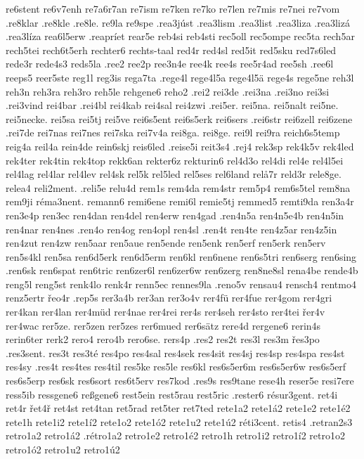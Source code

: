 {{re6stent
re6v7enh
re7a6r7an
re7ism
re7ken
re7ko
re7len
re7mis
re7nei
re7vom
.re8klar
.re8kle
.re8le.
re9la
re9spe
.rea3júst
.rea3lism
.rea3list
.rea3liza
.rea3lizá
.rea3líza
rea6l5erw
.reapríet
rear5e
reb4si
reb4sti
rec5oll
rec5ompe
rec5ta
rech5ar
rech5tei
rech6t5erh
rechter6
rechts-taal
red4r
red4sl
red5it
red5sku
red7s6led
rede3r
rede4s3
reds5la
.ree2
ree2p
ree3n4e
ree4k
ree4s
ree5r4ad
ree5sh
.ree6l
reeps5
reer5ste
reg1l
reg3is
rega7ta
.rege4l
rege4l5a
rege4l5ä
rege4s
rege5ne
reh3l
reh3n
reh3ra
reh3ro
reh5le
rehgene6
reho2
.rei2
rei3de
.rei3na
.rei3no
rei3si
.rei3vind
rei4bar
.rei4bl
rei4kab
rei4sal
rei4zwi
.rei5er.
rei5na.
rei5nalt
rei5ne.
rei5necke.
rei5sa
rei5tj
rei5ve
rei6s5ent
rei6s5erk
rei6sers
.rei6str
rei6zell
rei6zene
.rei7de
rei7nas
rei7nes
rei7ska
rei7v4a
rei8ga.
rei8ge.
rei9l
rei9ra
reich6s5temp
reig4a
reil4a
rein4de
rein6skj
reis6led
.reise5i
reit3s4
.rej4
rek3sp
rek4k5v
rek4led
rek4ter
rek4tin
rek4top
rekk6an
rekter6z
rekturin6
rel4d3o
rel4di
rel4e
rel4l5ei
rel4lag
rel4lar
rel4lev
rel4sk
rel5k
rel5led
rel5ses
rel6land
relå7r
reld3r
rele8ge.
relea4
reli2ment.
.reli5e
relu4d
rem1s
rem4da
rem4str
rem5p4
rem6s5tel
rem8na
rem9ji
réma3nent.
remann6
remi6ene
remi6l
remie5tj
remmed5
remti9da
ren3a4r
ren3e4p
ren3ec
ren4dan
ren4del
ren4erw
ren4gad
.ren4n5a
ren4n5e4b
ren4n5in
ren4nar
ren4nes
.ren4o
ren4og
ren4opl
ren4sl
.ren4t
ren4te
ren4z5ar
ren4z5in
ren4zut
ren4zw
ren5aar
ren5aue
ren5ende
ren5enk
ren5erf
ren5erk
ren5erv
ren5s4kl
ren5sa
ren6d5erk
ren6d5erm
ren6kl
ren6nene
ren6s5tri
ren6serg
ren6sing
.ren6sk
ren6spat
ren6tric
ren6zer6l
ren6zer6w
ren6zerg
ren8ne8sl
rena4be
rende4b
reng5l
reng5st
renk4lo
renk4r
renn5ec
rennes9la
.reno5v
rensau4
rensch4
rentmo4
renz5ertr
řeo4r
.rep5s
rer3a4b
rer3an
rer3o4v
rer4fü
rer4fue
rer4gom
rer4gri
rer4kan
rer4lan
rer4müd
rer4nae
rer4rei
rer4s
rer4seh
rer4sto
rer4tei
řer4v
rer4wac
rer5ze.
rer5zen
rer5zes
rer6mued
rer6sätz
rere4d
rergene6
rerin4s
rerin6ter
rerk2
rero4
rero4b
rero6se.
rers4p
.res2
res2t
res3l
res3m
řes3po
.res3sent.
res3t
res3té
res4po
res4sal
res4sek
res4sit
res4sj
res4sp
res4spa
res4st
res4sy
.res4t
res4tes
res4til
res5ke
res5le
res6kl
res6s5er6m
res6s5er6w
res6s5erf
res6s5erp
res6sk
res6sort
res6t5erv
res7kod
.res9s
res9tane
rese4h
reser5e
resi7ere
ress5ib
ressgene6
reßgene6
rest5ein
rest5rau
rest5ric
.rester6
résur3gent.
ret4i
ret4r
řet4ř
ret4st
ret4tan
ret5rad
ret5ter
ret7ted
rete1a2
rete1á2
rete1e2
rete1é2
rete1h
rete1i2
rete1í2
rete1o2
rete1ó2
rete1u2
rete1ú2
réti3cent.
retis4
.retran2s3
retro1a2
retro1á2
.rétro1a2
retro1e2
retro1é2
retro1h
retro1i2
retro1í2
retro1o2
retro1ó2
retro1u2
retro1ú2
}}
